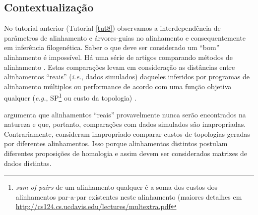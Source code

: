 \newpage
\pagestyle{fancy} %
\begin{refsection}
\renewcommand*{\finalnamedelim}{\addspace\&\space} %
%
\newcommand{\A}{\textcolor{green}{\textbf{A}}}
\newcommand{\C}{\textcolor{blue}{\textbf{C}}}
\newcommand{\G}{\textcolor{gray}{\textbf{G}}}
\newcommand{\T}{\textcolor{red}{\textbf{T}}}
\newcommand{\gap}{\textcolor{black}{\textbf{-}}}


\section{Contextualização}\label{tut9:context}

No tutorial anterior (Tutorial \ref{tut8}) observamos a interdependência de parâmetros de alinhamento e árvores-guias no alinhamento e consequentemente em inferência filogenética. Saber o que deve ser considerado um ``bom'' alinhamento é impossível. Há uma série de artigos comparando métodos de alinhamento \parencite[veja][:145, e referências citadas]{Wheeler_2012}. Estas comparações levam em consideração as distâncias entre alinhamentos ``reais'' (\textit{i.e.}, dados simulados) daqueles inferidos por programas de alinhamento múltiplos \parencite[\textit{i.e.}, ][]{Ogden_and_Rosemberg_2007} ou performance de acordo com uma função objetiva qualquer (\textit{e.g.}, SP\footnote{ \textit{sum-of-pairs} de um alinhamento qualquer é a soma dos custos dos alinhamentos par-a-par existentes neste alinhamento (maiores detalhes em \url{http://cs124.cs.ucdavis.edu/lectures/multextra.pdf}} ou custo da topologia) \parencite[\textit{e.g.}, ][]{Wheeler_and_Giribet_2009}.

\textcite{Wheeler_2012} argumenta que alinhamentos ``reais'' provavelmente nunca serão encontrados na natureza e que, portanto, comparações com dados simulados são inapropriadas. Contrariamente, \textcite[][:190]{Ogden_and_Rosemberg_2007} consideram inapropriado comparar custos de topologias geradas por diferentes alinhamentos. Isso porque alinhamentos distintos postulam diferentes proposições de homologia e assim devem ser considerados matrizes de dados distintas.


\end{refsection}
